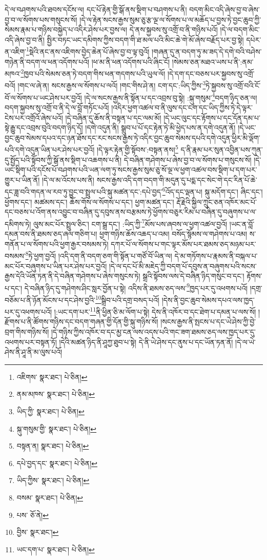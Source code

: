 དེ་ལ་བཤགས་པའི་ཐབས་དངོས་ལ། དང་པོ་རྟེན་གྱི་སྒོ་ནས་སྡིག་པ་བཤགས་པ་ནི། བདག་མིང་འདི་ཞེས་བྱ་བ་ཞེས་བྱ་བ་ལ་སོགས་པས་གསུངས་སོ། །དེ་ལ་རྟེན་སངས་རྒྱས་སུམ་ཅུ་རྩ་ལྔ་ལ་སོགས་པ་ལ་མཆོད་པ་བྱས་ཏེ་བྱང་ཆུབ་ཀྱི་སེམས་རྣམ་པ་གཉིས་བསྐྱེད་པ་འདིར་ཤེས་པར་བྱས་ལ། དེ་ནས་སྐྱབས་སུ་འགྲོ་བ་ནི་གཉིས་པའོ། །དེ་ལ་བདག་མིང་འདི་ཞེས་བྱ་བ་ནི། སྤྱིར་བཏང་ཡང་དམིགས་ཀྱིས་བདག་གི་ཐ་མལ་པའི་མིང་ཆེ་གེ་མོ་ཞེས་བརྗོད་པར་བྱ་སྟེ། དཔེར་ན་འཇིག་\footnote{འཇིགས་  སྣར་ཐང་།  པེ་ཅིན། }སྡེའི་ནང་ནས་འཇིགས་བྱེད་ཆེན་པོ་ཞེས་བྱ་བ་ལྟ་བུའོ། །གཞན་དུ་ན་བདག་ཏུ་མ་ཟད་དེ་དགེ་བའི་བཤེས་གཉེན་ནི་བདག་ལ་ཕན་འདོགས་པའོ། །ཕ་མ་ནི་ཕན་འདོགས་པའི་ཞིང་ངོ། །སེམས་ཅན་མཐའ་ཡས་པ་ནི་:ནམ་མཁའ་\footnote{ནམ་མཁས་  སྣར་ཐང་།  པེ་ཅིན། }ཁྱབ་པའི་སེམས་ཅན་ཏེ་བདག་གིས་ཕན་གདགས་པའི་ཡུལ་ལོ། །དེ་དག་དང་བཅས་པར་སྐྱབས་སུ་འགྲོ་བའོ། །གང་ལ་ཞེ་ན། སངས་རྒྱས་ལ་སོགས་པ་ལའོ། །གང་གིས་ཤེ་ན། ངག་དང་:ཡིད་ཀྱིས་\footnote{ཡིད་ཀྱི་  སྣར་ཐང་།  པེ་ཅིན། }ཏེ་སྐྱབས་སུ་འགྲོ་བའི་ངོ་བོ་ལ་སོགས་པ་ཡང་ཤེས་པར་བྱའོ། །དེ་ལ་སངས་རྒྱས་ནི་སྟོན་པ་དང་འབྲས་བུ་སྟེ། :སྐུ་གསུམ་\footnote{སྐུ་གསུམ་གྱི་  སྣར་ཐང་།  པེ་ཅིན། }བདག་ཉིད་ཅན་ལ། བདག་སྐྱབས་སུ་འགྲོ་བ་ནི་དེ་ལ་བློ་གཏོང་པའོ། །འདིར་ཕྱག་འཚལ་བ་ནི་ལུས་དང་ངག་དང་ཡིད་ཀྱིས་ཏེ་དེ་ལྟར་ངེས་པར་འགྲོའོ་ཞེས་པའོ། །དེ་བཞིན་དུ་ཆོས་ནི་བསྟན་པ་དང་ལམ་མོ། །དེ་ཡང་ལུང་དང་རྟོགས་པ་དང་དོན་དམ་པ་སྟེ་རྒྱུ་དང་འབྲས་བུའི་བདག་ཉིད་དོ། །དགེ་འདུན་ནི། སྒྲུབ་པ་པོ་དང་རྟེན་ཏེ་མི་ཕྱེད་པས་ན་དགེ་འདུན་ནོ། །དེ་ཡང་བྱང་ཆུབ་སེམས་དཔའ་དང་ཉན་ཐོས་དང་རང་སངས་རྒྱས་ཏེ་འདིར་བྱང་ཆུབ་སེམས་དཔའི་དགེ་འདུན་ཕྱིར་མི་ལྡོག་པའི་དགེ་འདུན་ཡིན་པར་ཤེས་པར་བྱའོ། །དེ་ལྟར་རྟེན་གྱི་སྟོབས་:བསྟན་ནས།\footnote{བསྟན་ན།  སྣར་ཐང་།  པེ་ཅིན། } ད་ནི་རྣམ་པར་སུན་འབྱིན་པས་ཀུན་དུ་སྤྱོད་པའི་སྟོབས་ཀྱི་སྒོ་ནས་སྡིག་པ་འཆགས་པ་ནི། དེ་བཞིན་གཤེགས་པ་ཞེས་བྱ་བ་ལ་སོགས་པ་གསུངས་སོ། །དེ་ཡང་སྡིག་པའི་དངོས་པོ་བཤགས་པའི་ཡན་ལག་ཏུ་སངས་རྒྱས་སུམ་ཅུ་སོ་ལྔ་ལ་ཕྱག་འཚལ་བས་སྡིག་པ་དག་པར་གྱུར་པ་ཡིན་ནོ། །དེ་ལ་མ་འོངས་པས་ནི། སངས་རྒྱས་འདི་དག་བདག་གི་མདུན་དུ་པདྨ་དང་སེང་གེ་དང་རིན་པོ་ཆེ་དང་ཟླ་བའི་གདན་ལ་རབ་ཏུ་བྱུང་བ་སྤྲུལ་པའི་སྐུ་མཚན་དང་:དཔེ་བྱད་\footnote{དཔེ་བྱད་དང་  སྣར་ཐང་།  པེ་ཅིན། }འོད་དང་ལྡན་པ། སྐུ་མདོག་དང་། ཞིང་དང་། ཕྱོགས་དང་། མཚམས་དང་། ཆོས་གོས་ལ་སོགས་པ་དང་། ཕྱག་མཚན་དང་། རྡོ་རྗེའི་སྐྱིལ་ཀྲུང་ཅན་འཁོར་མང་པོ་དང་བཅས་པ་འོག་ནས་འབྱུང་བ་བཞིན་དུ་དབུས་ནས་བརྩམས་ཏེ་ཕྱོགས་བཅུར་རིམ་པ་བཞིན་དུ་བཞུགས་པ་ལ་དམིགས་ཏེ། ལུས་མང་པོར་སྤྲུལ་ཅིང་། ངག་སྒྲ་དང་། :ཡིད་ཀྱི་\footnote{ཡིད་ཀྱིས་  སྣར་ཐང་།  པེ་ཅིན། }མོས་པས་ཞབས་ལ་ཕྱག་འཚལ་བྱའོ། །ཡང་ན་བློ་དམན་བས་ནི་ཐམས་ཅད་ཞལ་གཅིག་པ། ཕྱག་གཉིས་ཆོས་འཆད་པ་འམ། བསོད་སྙོམས་ལ་གཤེགས་པ་འམ། ས་གནོན་པ་ལ་སོགས་པའི་ཕྱག་རྒྱར་བསམས་ཏེ། དཀར་པོ་ལ་སོགས་པ་གང་ལྟར་མོས་པར་ཐམས་ཅད་མཉམ་པར་བསམས་\footnote{བསམ་  སྣར་ཐང་།  པེ་ཅིན། }ཏེ་ཕྱག་བྱའོ། །འདི་དག་ནི་བདག་ཅག་གི་སྟོན་པ་གཙོ་བོ་ཡིན་ལ། དེ་མ་གཏོགས་པ་རྣམས་ནི་བསྐལ་པ་མང་པོར་བཞུགས་པ་ཡིན་པར་ཤེས་པར་བྱའོ། །དེ་ལ་དང་པོ་མི་མཇེད་ཀྱི་བདག་པོ་དབུས་ན་བཞུགས་པའི་སངས་རྒྱས་དེའི་ཡོན་ཏན་ནི་དེ་བཞིན་གཤེགས་པ་ཞེས་གསུངས་ཏེ། སྒྲའི་སྟོབས་ལས་དེ་བཞིན་ཉིད་གསུང་བ་དང་། རྟོགས་པ་དང་། དེ་བཞིན་ཉིད་དུ་གཤེགས་ཤིང་སླར་བྱོན་པ་སྟེ། འདིས་ནི་ཐམས་ཅད་ལས་\footnote{པས་  ཅོ་ནེ། }ཁྱད་པར་དུ་འཕགས་པའོ། །དགྲ་བཅོམ་པ་ནི་ཉོན་མོངས་པ་དང་ཤེས་བྱའི་\footnote{བྱིས་  སྣར་ཐང་། }སྒྲིབ་པའི་དགྲ་བསད་པའོ། །དེས་ནི་བྱང་ཆུབ་སེམས་དཔའ་ལས་ཁྱད་པར་དུ་འཕགས་པའོ། །:ཡང་དག་པར་\footnote{ཡང་དག་པ་  སྣར་ཐང་།  པེ་ཅིན། }ནི་ཕྱིན་ཅི་མ་ལོག་པ་སྟེ། དེས་ནི་འཁོར་བ་དང་ཐེག་པ་དམན་པ་ལས་སོ། །རྫོགས་པ་ནི་ཚོགས་གཉིས་དང་བདག་གཞན་གྱི་དོན་གྱི་སྐུ་གཉིས་སོ། །སངས་རྒྱས་ནི་སྤངས་པ་དང་ཡེ་ཤེས་ཀྱི་བྱེ་བྲག་གིས་གཉིས་སོ། །དེ་གཉིས་ཀྱིས་འཁོར་བ་དང་མྱ་ངན་ལས་འདས་པའི་གང་ཟག་ཐམས་ཅད་ལས་ཁྱད་པར་དུ་འཕགས་པར་བསྟན་ཏོ། །དེའི་མཚན་ཉིད་ནི་ཤཱཀྱ་ཐུབ་པ་སྟེ། དེ་ནི་ཡེ་ཤེས་དང་ནུས་པ་དང་ཡོན་ཏན་ནོ། །དེ་ལ་ཡེ་ཤེས་ནི་ཤཱ་ནི་མ་ལུས་པའོ། 